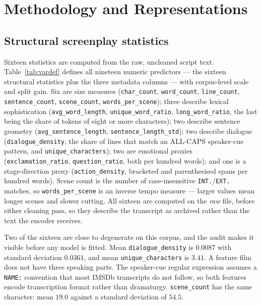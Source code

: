 \documentclass[conference,a4paper]{IEEEtran}
\begin{document}
\section{Methodology and Representations}
\label{sec:method}

\subsection{Structural screenplay statistics}

Sixteen statistics are computed from the raw, uncleaned script text.
Table~\ref{tab:vardef} defines all nineteen numeric predictors --- the
sixteen structural statistics plus the three metadata columns --- with
corpus-level scale and split gain. Six are size
measures (\texttt{char\_count}, \texttt{word\_count},
\texttt{line\_count}, \texttt{sentence\_count}, \texttt{scene\_count},
\texttt{words\_per\_scene}); three describe lexical sophistication
(\texttt{avg\_word\_length}, \texttt{unique\_word\_ratio},
\texttt{long\_word\_ratio}, the last being the share of tokens of eight
or more characters); two describe sentence geometry
(\texttt{avg\_sentence\_length}, \texttt{sentence\_length\_std}); two
describe dialogue (\texttt{dialogue\_density}, the share of lines that
match an ALL-CAPS speaker-cue pattern, and
\texttt{unique\_characters}); two are emotional proxies
(\texttt{exclamation\_ratio}, \texttt{question\_ratio}, both per hundred
words); and one is a stage-direction proxy (\texttt{action\_density},
bracketed and parenthesised spans per hundred words). Scene count is the
number of case-insensitive \texttt{INT.}/\texttt{EXT.} matches, so
\texttt{words\_per\_scene} is an inverse tempo measure --- larger values
mean longer scenes and slower cutting. All sixteen are computed on the
\emph{raw} file, before either cleaning pass, so they describe the
transcript as archived rather than the text the encoder receives.

Two of the sixteen are close to degenerate on this corpus, and the audit
makes it visible before any model is fitted. Mean
\texttt{dialogue\_density} is $0.0087$ with standard deviation $0.0361$,
and mean \texttt{unique\_characters} is $3.41$. A feature film does not
have three speaking parts. The speaker-cue regular expression assumes a
\texttt{NAME:} convention that most IMSDb transcripts do not follow, so
both features encode transcription format rather than dramaturgy.
\texttt{scene\_count} has the same character: mean $19.0$ against a
standard deviation of $54.5$.
\end{document}
